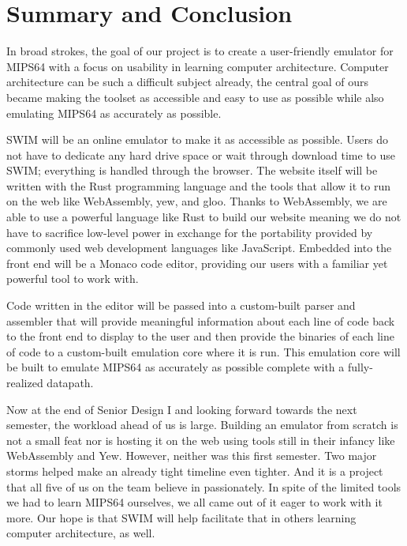 \documentclass[
    paper=letter,
    parskip=half,
    fontsize=12pt,
    titlepage=firstiscover,
    toc=bibliography,
    numbers=endperiod
]{scrartcl}
\let\oldsection\section
\renewcommand{\section}{\newpage\oldsection}
\begin{document}
\section{Summary and Conclusion}

In broad strokes, the goal of our project is to create a user-friendly
emulator for MIPS64 with a focus on usability in learning computer
architecture. Computer architecture can be such a difficult subject
already, the central goal of ours became making the toolset as
accessible and easy to use as possible while also emulating MIPS64 as
accurately as possible.

SWIM will be  an online emulator to make it as accessible as possible.
Users do not have to dedicate any hard drive space or wait through
download time to use SWIM; everything is handled through the browser.
The website itself will be written with the Rust programming language
and the tools that allow it to run on the web like WebAssembly, yew, and
gloo. Thanks to WebAssembly, we are able to use a powerful language like
Rust to build our website meaning we do not have to sacrifice low-level
power in exchange for the portability provided by commonly used web
development languages like JavaScript. Embedded into the front end will
be a Monaco code editor, providing our users with a familiar yet
powerful tool to work with.

Code written in the editor will be passed into a custom-built parser and
assembler that will provide meaningful information about each line of
code back to the front end to display to the user and then provide the
binaries of each line of code to a custom-built emulation core where it
is run. This emulation core will be built to emulate MIPS64 as
accurately as possible complete with a fully-realized datapath.

Now at the end of Senior Design I and looking forward towards the next
semester, the workload ahead of us is large. Building an emulator from
scratch is not a small feat nor is hosting it on the web using tools
still in their infancy like WebAssembly and Yew. However, neither was
this first semester. Two major storms helped make an already tight
timeline even tighter. And it is a project that all five of us on the
team believe in passionately. In spite of the limited tools we had to
learn MIPS64 ourselves, we all came out of it eager to work with it
more. Our hope is that SWIM will help facilitate that in others learning
computer architecture, as well.

\printbibliography
\end{document}
